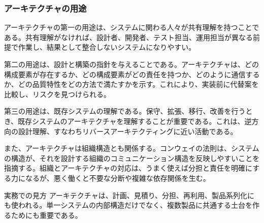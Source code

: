 \subsubsection{アーキテクチャの用途}
アーキテクチャの第一の用途は、システムに関わる人々が共有理解を持つことである。共有理解がなければ、設計者、開発者、テスト担当、運用担当が異なる前提で作業し、結果として整合しないシステムになりやすい。

第二の用途は、設計と構築の指針を与えることである。アーキテクチャは、どの構成要素が存在するか、どの構成要素がどの責任を持つか、どのように通信するか、どの品質特性をどの方法で満たすかを示す。これにより、実装前に代替案を比較し、リスクを見つけられる。

第三の用途は、既存システムの理解である。保守、拡張、移行、改善を行うとき、既存システムのアーキテクチャを理解することが重要である。これは、逆方向の設計理解、すなわちリバースアーキテクティングに近い活動である。

また、アーキテクチャは組織構造とも関係する。コンウェイの法則は、システムの構造が、それを設計する組織のコミュニケーション構造を反映しやすいことを指摘する。組織とアーキテクチャの対応は、うまく使えば分担と責任を明確にする力になるが、悪く働くと不要な分断や複雑な依存関係を生む。

\begin{statementbox}{実務での見方}
アーキテクチャは、計画、見積り、分担、再利用、製品系列化にも使われる。単一システムの内部構造だけでなく、複数製品に共通する土台を作るためにも重要である。
\end{statementbox}
